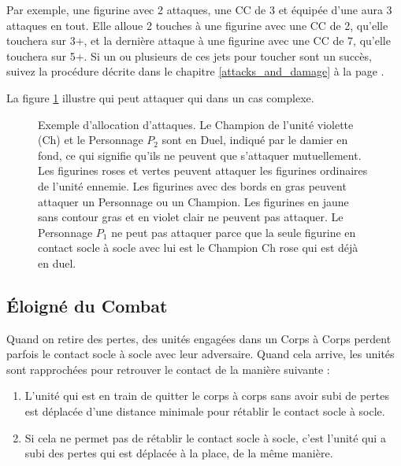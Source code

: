Par exemple, une figurine avec 2 attaques, une CC de 3 et équipée d'une \pw{} aura 3 attaques en tout. Elle alloue 2 touches à une figurine avec une CC de 2, qu'elle touchera sur 3+, et la dernière attaque à une figurine avec une CC de 7, qu'elle touchera sur 5+. Si un ou plusieurs de ces jets pour toucher sont un succès, suivez la procédure décrite dans le chapitre \ref{attacks_and_damage} à la page \pageref{attacks_and_damage}.

La figure \ref{figure/allocation} illustre qui peut attaquer qui dans un cas complexe.

\newcommand{\figAHCharOne}{$P_{1} $}
\newcommand{\figAHCharTwo}{$P_{2} $}
\newcommand{\figAHCharThree}{$P_{3} $}
\newcommand{\figAHChamp}{Ch}
\newcommand{\figAHMus}{Mu}
\newcommand{\figAHStand}{Ét}

\begin{figure}[!htbp]
\begin{minipage}{0.52\textwidth}
\def\svgwidth{\textwidth}

\end{minipage}\hfill\begin{minipage}{0.45\textwidth}
\caption{Exemple d'allocation d'attaques.\vspace*{10pt}\newline
Le Champion de l'unité violette (Ch) et le Personnage $ P_{2} $ sont en Duel, indiqué par le damier en fond, ce qui signifie qu'ils ne peuvent que s'attaquer mutuellement. Les figurines roses et vertes peuvent attaquer les figurines ordinaires de l'unité ennemie. Les figurines avec des bords en gras peuvent attaquer un Personnage ou un Champion. Les figurines en jaune sans contour gras et en violet clair ne peuvent pas attaquer. Le Personnage $ P_{1} $ ne peut pas attaquer parce que la seule figurine en contact socle à socle avec lui est le Champion Ch rose qui est déjà en duel.}
\label{figure/allocation}
\end{minipage}
\end{figure}

\newpage
\subsection{Éloigné du Combat}
\label{dropping_out_of_combat}

Quand on retire des pertes, des unités engagées dans un Corps à Corps perdent parfois le contact socle à socle avec leur adversaire. Quand cela arrive, les unités sont rapprochées pour retrouver le contact de la manière suivante :
\begin{enumerate}
\item L'unité qui est en train de quitter le corps à corps sans avoir subi de pertes est déplacée d'une distance minimale pour rétablir le contact socle à socle.
\item Si cela ne permet pas de rétablir le contact socle à socle, c'est l'unité qui a subi des pertes qui est déplacée à la place, de la même manière.
\end{enumerate}

